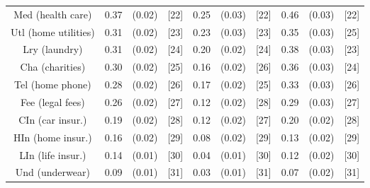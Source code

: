 \documentclass[a4paper,10pt]{article}
\begin{document}
\begin{tabular}{cccccccccc}
Med (health care)&0.37&(0.02)&[22] & 0.25&(0.03)&[22] & 0.46 & (0.03) & [22] \\
Utl (home utilities)&0.31&(0.02)&[23] & 0.23&(0.03)&[23] & 0.35 & (0.03) & [25]\\
Lry (laundry)&0.31&(0.02)&[24] & 0.20&(0.02)&[24] & 0.38 & (0.03) & [23] \\
Cha (charities)&0.30&(0.02)&[25] & 0.16&(0.02)&[26] & 0.36 & (0.03) & [24] \\
Tel (home phone)&0.28&(0.02)&[26] & 0.17&(0.02)&[25] & 0.33 & (0.03) & [26] \\
Fee (legal fees)&0.26&(0.02)&[27] & 0.12&(0.02)&[28] & 0.29 & (0.03) & [27] \\
CIn (car insur.)&0.19&(0.02)&[28] & 0.12&(0.02)&[27] & 0.20 & (0.02) & [28] \\
HIn (home insur.)&0.16&(0.02)&[29] & 0.08&(0.02)&[29] & 0.13 & (0.02) & [29] \\
LIn (life insur.)&0.14&(0.01)&[30] & 0.04&(0.01)&[30] & 0.12 & (0.02) & [30] \\
Und (underwear)&0.09&(0.01)&[31] & 0.03&(0.01)&[31] & 0.07 & (0.02) & [31] \\
\hline \hline
\end{tabular}
\end{document}
